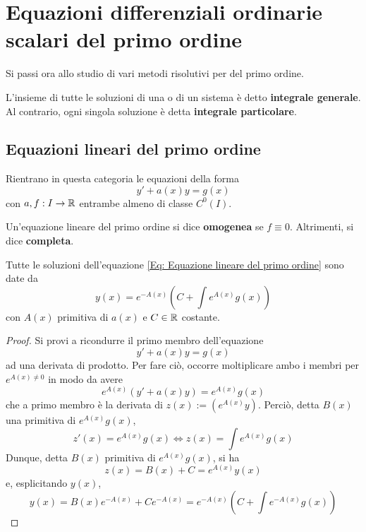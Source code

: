 \section{Equazioni differenziali ordinarie scalari del primo ordine}
Si passi ora allo studio di vari metodi risolutivi per \odes del primo ordine. 
\begin{definition}
    L'insieme di tutte le soluzioni di una \ode o di un sistema è detto \textbf{integrale generale}. Al contrario, ogni singola soluzione è detta \textbf{integrale particolare}.
\end{definition}
\subsection{Equazioni lineari del primo ordine}
Rientrano in questa categoria le equazioni della forma
\begin{equation} \label{Eq: Equazione lineare del primo ordine}
    y'+ a(x) y = g(x)
\end{equation}
con $a,f: I \to \mathbb{R}$ entrambe almeno di classe $C^0(I)$.\\
\begin{definition}
    Un'equazione lineare del primo ordine si dice \textbf{omogenea} se $f \equiv 0$. Altrimenti, si dice \textbf{completa}.
\end{definition}
\begin{theorem} \label{Teo: Integrale generale delle ode lineare del primo ordine}
    Tutte le soluzioni dell'equazione \eqref{Eq: Equazione lineare del primo ordine} sono date da
    \begin{equation}
        y(x)=e^{-A(x)}\left(C+ \int{e^{A(x)}g(x)}\right)
    \end{equation}
    con $A(x)$ primitiva di $a(x)$ e $C \in \mathbb{R}$ costante.
\end{theorem}
\begin{proof} 
Si provi a ricondurre il primo membro  dell'equazione 
\begin{equation}
    y'+ a(x) y = g(x)
\end{equation}
ad una derivata di prodotto. Per fare ciò, occorre moltiplicare ambo i membri per $e^{A(x) \neq 0}$ in modo da avere
\begin{equation}
    e^{A(x)}(y'+a(x)y)= e^{A(x)}g(x)
\end{equation}
che a primo membro è la derivata di $z(x):=\left(e^{A(x)}y \right)$. Perciò, detta $B(x)$ una primitiva di $e^{A(x)}g(x)$,
\begin{equation}
    z'(x)= e^{A(x)}g(x) \iff z(x)=\int e^{A(x)}g(x)
\end{equation}
Dunque, detta $B(x)$ primitiva di $e^{A(x)}g(x)$, si ha
\begin{equation}
 z(x)= B(x)+C= e^{A(x)}y(x)
 \end{equation}
 e, esplicitando $y(x)$,
 \begin{equation}
    y(x)= B(x) e^{-A(x)} + C{e^{-A(x)}} = e^{-A(x)}\left( C + \int e^{-A(x)}g(x) \right)
 \end{equation}
\end{proof}
